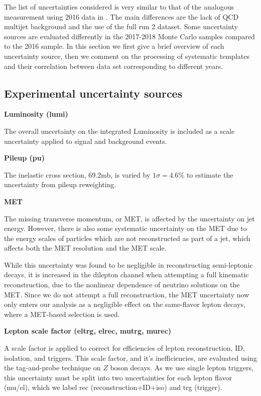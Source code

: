 The list of uncertainties considered is very similar to that of the analogous measurement using 2016 data in \cite{ytpaper}. The main differences are the lack of QCD multijet background and the  use of the full run 2 dataset. Some uncertainty sources are evaluated differently in the 2017-2018 Monte Carlo samples compared to the 2016 sample. In this section we first give a brief overview of each uncertainty source, then we comment on the processing of systematic templates and their correlation between data set corresponding to different years.

\label{S:otherunc}
\label{SS:syslist}
\subsection*{Experimental uncertainty sources}


\noindent \textbf{Luminosity (lumi)}

The overall uncertainty on the integrated Luminosity is included as a scale uncertainty applied to signal and background events. 

\par \noindent
\textbf{Pileup (pu)}

The inelastic cross section, 69.2\unit{mb}, is varied by $1\sigma = 4.6\%$ to estimate the uncertainty from pileup reweighting.

\par \noindent
\textbf{MET}

The missing transverse momentum, or MET, is affected by the uncertainty on jet energy. However, there is also some systematic uncertainty on the MET due to the energy scales of particles which are not reconstructed as part of a jet, which affects both  the MET resolution and the MET scale.

While  this uncertainty was found to be negligible in reconstructing semi-leptonic decays, it is increased in the dilepton channel when attempting a full kinematic reconstruction, due to the nonlinear dependence of neutrino solutions on the MET. Since we do not attempt a full reconstruction, the MET uncertainty now only enters our analysis as a negligible effect on the same-flavor lepton decays, where a MET-based selection is used.

\par \noindent
\textbf{Lepton scale factor (eltrg, elrec, mutrg, murec)}

A scale factor is applied to correct for efficiencies of lepton reconstruction, ID, isolation, and triggers. This scale factor, and it's inefficiencies, are evaluated using the tag-and-probe technique on $Z$ boson decays. As we use single lepton triggers, this uncertainty must be split into two uncertainties for each lepton flavor (mu/el), which we label rec (reconstruction+ID+iso) and trg (trigger).

